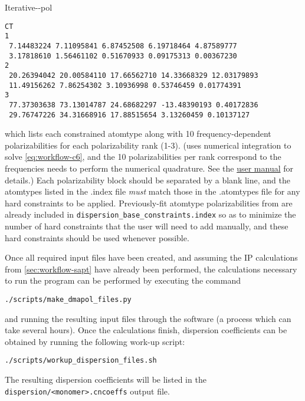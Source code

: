 \begin{subsubsection}{Iterative-\dma-pol}
\begin{enumerate}
\begin{minipage}{\linewidth}
\begin{lstlisting}
CT
1 
 7.14483224 7.11095841 6.87452508 6.19718464 4.87589777 
 3.17818610 1.56461102 0.51670933 0.09175313 0.00367230 
2 
 20.26394042 20.00584110 17.66562710 14.33668329 12.03179893 
 11.49156262 7.86254302 3.10936998 0.53746459 0.01774391 
3 
 77.37303638 73.13014787 24.68682297 -13.48390193 0.40172836 
 29.76747226 34.31668916 17.88515654 3.13260459 0.10137127

\end{lstlisting}
\end{minipage}
which lists each constrained atomtype along with 10 frequency-dependent
polarizabilities for each polarizability rank (1-3). (\camcasp uses numerical
integration to solve \cref{eq:workflow-c6}, and the 10 polarizabilities per
rank correspond to the frequencies \camcasp needs to perform the numerical
quadrature. See the
\href{http://www-stone.ch.cam.ac.uk/programs/camcasp.html}{\camcasp user
manual} for details.) Each polarizability block should be separated by a blank
line, and the atomtypes listed in the .index file \emph{must} match those in
the .atomtypes file for any hard constraints to be applied. 
Previously-fit atomtype polarizabilities from  are already included in 
\verb|dispersion_base_constraints.index| so as to minimize the number of hard
constraints that the user will need to add manually, and these hard
constraints should be used whenever possible.
\end{enumerate}

Once all required input files have been created, and assuming the IP calculations
from \cref{sec:workflow-sapt} have already been performed,
the \camcasp calculations necessary to run the \idma program
can be performed by executing the command 
%
\begin{lstlisting}
./scripts/make_dmapol_files.py
\end{lstlisting}
%
and running the resulting input files through the \camcasp software (a process
which can take several hours).
Once the \camcasp calculations finish, dispersion coefficients can be obtained by running the following
work-up script:
%
\begin{lstlisting}
./scripts/workup_dispersion_files.sh
\end{lstlisting}
%
The resulting dispersion coefficients will be listed in the
\verb|dispersion/<monomer>.cncoeffs| output file.


\end{subsubsection}
